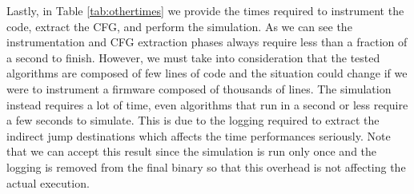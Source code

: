 Lastly, in Table \ref{tab:othertimes} we provide the times required to instrument
the code, extract the CFG, and perform the simulation. As we can see the
instrumentation and CFG extraction phases always require less than a fraction of
a second to finish. However, we must take into consideration that the tested
algorithms are composed of few lines of code and the situation could change if
we were to instrument a firmware composed of thousands of lines. The simulation instead
requires a lot of time, even algorithms that run in a second or less require a
few seconds to simulate. This is due to the logging required to extract the indirect
jump destinations which affects the time performances seriously. Note that we
can accept this result since the simulation is run only once and the logging is
removed from the final binary so that this overhead is not affecting the actual
execution.

